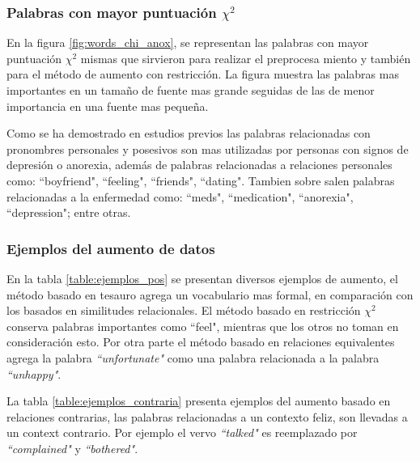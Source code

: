 \subsubsection{Palabras con mayor puntuación $\chi^2$}
En la figura \ref{fig:words_chi_anox}, se representan las palabras con mayor puntuación $\chi^2$ mismas que sirvieron para realizar el preprocesa miento y también para el método de aumento con restricción. La figura muestra las palabras mas importantes en un tamaño de fuente mas grande seguidas de las de menor importancia en una fuente mas pequeña. 

Como se ha demostrado en estudios previos las palabras relacionadas con pronombres personales y posesivos son mas utilizadas por personas con signos de depresión o anorexia, además de palabras relacionadas a relaciones personales como: ``boyfriend", ``feeling", ``friends", ``dating". Tambien sobre salen palabras relacionadas a la enfermedad como: ``meds", ``medication", ``anorexia", ``depression"; entre otras.



\subsubsection{Ejemplos del aumento de datos}
En la tabla \ref{table:ejemplos_pos} se presentan diversos ejemplos de aumento, el método basado en tesauro agrega un vocabulario mas formal, en comparación con los basados en similitudes relacionales. El método basado en restricción $\chi^2$ conserva palabras importantes como ``feel", mientras que los otros no toman en consideración esto. Por otra parte el método basado en relaciones equivalentes agrega la palabra \textit{``unfortunate"} como una palabra relacionada a la palabra \textit{``unhappy"}.

La tabla \ref{table:ejemplos_contraria} presenta ejemplos del aumento basado en relaciones contrarias, las palabras relacionadas a un contexto feliz, son llevadas a un context contrario. Por ejemplo el vervo \textit{``talked"} es reemplazado por \textit{``complained"} y \textit{``bothered"}.






